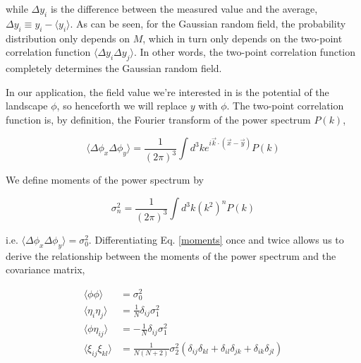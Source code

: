 \documentclass[12pt]{article}
\begin{document}
\noindent while $\Delta y_i$ is the difference between the measured value and the average, $\Delta y_i \equiv y_i - \langle y_i \rangle$. As can be seen, for the Gaussian random field, the probability distribution only depends on $M$, which in turn only depends on the two-point correlation function $\langle \Delta y_i \Delta y_j \rangle$. In other words, the two-point correlation function completely determines the Gaussian random field.

In our application, the field value we're interested in is the potential of the landscape $\phi$, so henceforth we will replace $y$ with $\phi$. The two-point correlation function is, by definition, the Fourier transform of the power spectrum $P(k)$,

\begin{equation}
\langle \Delta \phi_x \Delta \phi_y \rangle = \frac{1}{(2\pi)^3} \int d^3k e^{i \vec{k} \cdot (\vec{x}-\vec{y})} P(k)
\end{equation}

We define moments of the power spectrum by

\begin{equation} \label{moments}
\sigma_n^2 = \frac{1}{(2\pi)^3}\int d^3k (k^{2})^n P(k)
\end{equation}

\noindent i.e. $\langle \Delta \phi_x \Delta \phi_y \rangle = \sigma_0^2$. Differentiating Eq. \ref{moments} once and twice allows us to derive the relationship between the moments of the power spectrum and the covariance matrix,


\begin{equation} \label{corr}
\begin{split}
\langle\phi\phi\rangle &= \sigma_0^2 \\
\langle\eta_i\eta_j\rangle &= \frac{1}{N}\delta_{ij}\sigma_1^2 \\
\langle\phi\eta_{ij}\rangle &= -\frac{1}{N}\delta_{ij}\sigma_1^2 \\
\langle\xi_{ij}\xi_{kl}\rangle &= \frac{1}{N(N+2)}\sigma_2^2(\delta_{ij}\delta_{kl}+\delta_{il}\delta_{jk}+\delta_{ik}\delta_{jl})
\end{split}
\end{equation}
\end{document}
